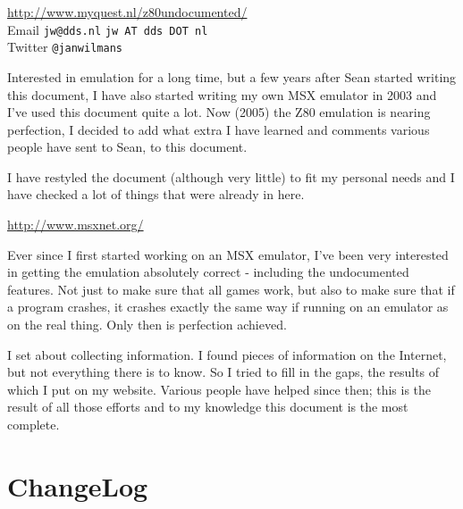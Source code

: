 \documentclass[12pt,twoside,openright,a4paper]{book}
\makeatletter
\newcommand*{\PRINTED}{}	%
\newcommand{\email}[3]{
	\ifdefined\PRINTED
		{\tt #1@#2.#3}
	\else
		{\tt #1 AT #2 DOT #3}
	\fi
}
\makeatother
\begin{document}
\begin{description}[style=unboxed,leftmargin=0cm]
	\item[Jan]\hfill
	
	\url{http://www.myquest.nl/z80undocumented/}\\
	Email \email{jw}{dds}{nl}\\
	Twitter {\tt @janwilmans}

	Interested in emulation for a long time, but a few years after Sean started writing this document, I have also started writing my own MSX emulator in 2003 and I've used this document quite a lot. Now (2005) the Z80 emulation is nearing perfection, I decided to add what extra I have learned and comments various people have sent to Sean, to this document.

	I have restyled the document (although very little) to fit my personal needs and I have checked a lot of things that were already in here.
 
	\item[Sean]\hfill

	\url{http://www.msxnet.org/}
	
	Ever since I first started working on an MSX emulator, I've been very interested in getting the emulation absolutely correct - including the undocumented features. Not just to make sure that all games work, but also to make sure that if a program crashes, it crashes exactly the same way if running on an emulator as on the real thing. Only then is perfection achieved.

	I set about collecting information. I found pieces of information on the Internet, but not everything there is to know. So I tried to fill in the gaps, the results of which I put on my website. Various people have helped since then; this is the result of all those efforts and to my knowledge this document is the most complete.
\end{description}


\pagebreak
\section{ChangeLog}
\end{document}

